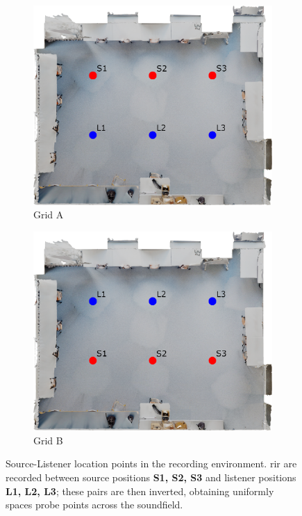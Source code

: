 \begin{figure}
    \centering
    \begin{subfigure}[t]{0.45\textwidth}
       \centering
       \includegraphics[width=\textwidth]{grid-a}
       \caption{Grid A}
       \label{fig:grid-a-probes}
    \end{subfigure}
    \begin{subfigure}[t]{0.45\textwidth}
       \centering
       \includegraphics[width=\textwidth]{grid-b}
       \caption{Grid B}
       \label{fig:grid-b-probes}
    \end{subfigure}
\caption{Source-Listener location points in the recording environment. \acrshort{rir} are recorded between source positions \textbf{S1, S2, S3} and listener positions \textbf{L1, L2, L3}; these pairs are then inverted, obtaining uniformly spaces probe points across the soundfield.}
\label{fig:rir-recording-probes}
\end{figure}

